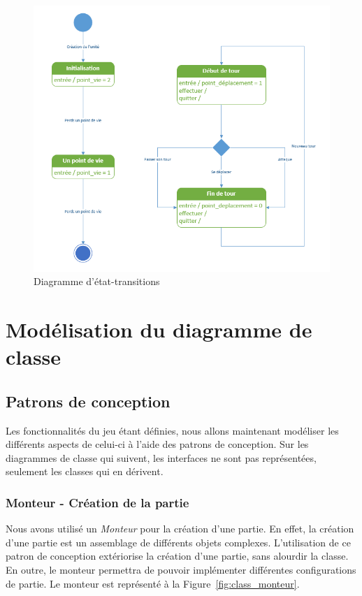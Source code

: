 \documentclass[a4paper]{article}%
\begin{document}
\begin{figure}[H]
    \centering
    \includegraphics[width=\textwidth]{./images/etat_transitions/cycle_unite.png}
		\caption{Diagramme d'état-transitions }
		\label{fig:trans_unite}
\end{figure}

\section{Modélisation du diagramme de classe}

\subsection{Patrons de conception}
Les fonctionnalités du jeu étant définies, nous allons maintenant modéliser les différents aspects de celui-ci à l'aide des patrons de conception. Sur les diagrammes de classe qui suivent, les interfaces ne sont pas représentées, seulement les classes qui en dérivent.

\subsubsection{Monteur - Création de la partie}

Nous avons utilisé un \textit{Monteur} pour la création d'une partie. En effet, la création d'une partie est un assemblage de différents objets complexes. L'utilisation de ce patron de conception extériorise la création d'une partie, sans alourdir la classe.
En outre, le monteur permettra de pouvoir implémenter différentes configurations de partie. Le monteur est représenté à la Figure~\ref{fig:class_monteur}.
\end{document}
